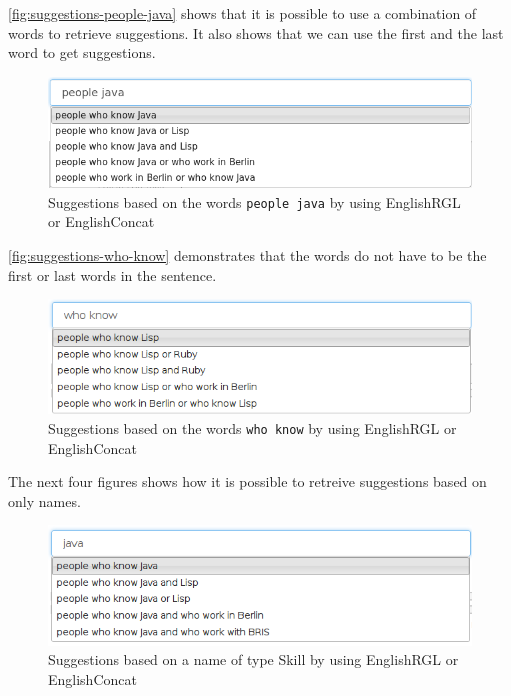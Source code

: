 \autoref{fig:suggestions-people-java} shows that it is possible to use a combination of words to retrieve suggestions. It also shows that we can use the first and the last word to get suggestions.

\begin{figure}[H]
\includegraphics[scale=0.54,keepaspectratio,valign=t]{./gfx/people-java.png}
\caption{Suggestions based on the words \texttt{people java} by using EnglishRGL or EnglishConcat\label{fig:suggestions-people-java}}
\end{figure}

\autoref{fig:suggestions-who-know} demonstrates that the words do not have to be the first or last words in the sentence.

\begin{figure}[H]
\includegraphics[scale=0.6,keepaspectratio,valign=t]{./gfx/who_know.png}
\caption{Suggestions based on the words \texttt{who know} by using EnglishRGL or EnglishConcat\label{fig:suggestions-who-know}}
\end{figure}

The next four figures shows how it is possible to retreive suggestions based on only names.

\begin{figure}[H]
\includegraphics[scale=0.6,keepaspectratio,valign=t]{./gfx/java.png}
\caption{Suggestions based on a name of type Skill by using EnglishRGL or EnglishConcat\label{fig:name-skill}}
\end{figure}

